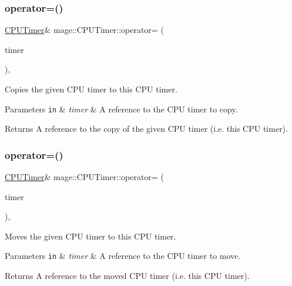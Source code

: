 \subsubsection{\texorpdfstring{operator=()}{operator=()}\hspace{0.1cm}{\footnotesize\ttfamily [1/2]}}
{\footnotesize\ttfamily \hyperlink{classmage_1_1_c_p_u_timer}{C\+P\+U\+Timer}\& mage\+::\+C\+P\+U\+Timer\+::operator= (\begin{DoxyParamCaption}\item[{const \hyperlink{classmage_1_1_c_p_u_timer}{C\+P\+U\+Timer} \&}]{timer }\end{DoxyParamCaption})\hspace{0.3cm}{\ttfamily [default]}, {\ttfamily [noexcept]}}

Copies the given C\+PU timer to this C\+PU timer.


\begin{DoxyParams}[1]{Parameters}
\mbox{\tt in}  & {\em timer} & A reference to the C\+PU timer to copy. \\
\hline
\end{DoxyParams}
\begin{DoxyReturn}{Returns}
A reference to the copy of the given C\+PU timer (i.\+e. this C\+PU timer). 
\end{DoxyReturn}
\hypertarget{classmage_1_1_c_p_u_timer_a9c831808d8caa71a019b5e4a6ffe360c}{}\label{classmage_1_1_c_p_u_timer_a9c831808d8caa71a019b5e4a6ffe360c} 
\subsubsection{\texorpdfstring{operator=()}{operator=()}\hspace{0.1cm}{\footnotesize\ttfamily [2/2]}}
{\footnotesize\ttfamily \hyperlink{classmage_1_1_c_p_u_timer}{C\+P\+U\+Timer}\& mage\+::\+C\+P\+U\+Timer\+::operator= (\begin{DoxyParamCaption}\item[{\hyperlink{classmage_1_1_c_p_u_timer}{C\+P\+U\+Timer} \&\&}]{timer }\end{DoxyParamCaption})\hspace{0.3cm}{\ttfamily [default]}, {\ttfamily [noexcept]}}

Moves the given C\+PU timer to this C\+PU timer.


\begin{DoxyParams}[1]{Parameters}
\mbox{\tt in}  & {\em timer} & A reference to the C\+PU timer to move. \\
\hline
\end{DoxyParams}
\begin{DoxyReturn}{Returns}
A reference to the moved C\+PU timer (i.\+e. this C\+PU timer). 
\end{DoxyReturn}
\hypertarget{classmage_1_1_c_p_u_timer_acb1a264ae09cea3d96794e3c0af246e7}{}\label{classmage_1_1_c_p_u_timer_acb1a264ae09cea3d96794e3c0af246e7} 
